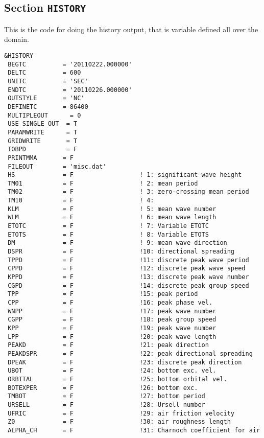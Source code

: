 \documentclass[12pt]{amsart}
\begin{document}
\subsection{Section {\tt HISTORY}}
This is the code for doing the history output, that is variable defined all over the domain.
\begin{verbatim}
&HISTORY
 BEGTC          = '20110222.000000'
 DELTC          = 600          
 UNITC          = 'SEC'        
 ENDTC          = '20110226.000000'
 OUTSTYLE       = 'NC'       
 DEFINETC       = 86400      
 MULTIPLEOUT      = 0        
 USE_SINGLE_OUT  = T         
 PARAMWRITE      = T       
 GRIDWRITE       = T       
 IOBPD           = F       
 PRINTMMA       = F        
 FILEOUT        = 'misc.dat'
 HS             = F                  ! 1: significant wave height
 TM01           = F                  ! 2: mean period
 TM02           = F                  ! 3: zero-crossing mean period
 TM10           = F                  ! 4: 
 KLM            = F                  ! 5: mean wave number
 WLM            = F                  ! 6: mean wave length
 ETOTC          = F                  ! 7: Variable ETOTC
 ETOTS          = F                  ! 8: Variable ETOTS
 DM             = F                  ! 9: mean wave direction
 DSPR           = F                  !10: directional spreading
 TPPD           = F                  !11: discrete peak wave period
 CPPD           = F                  !12: discrete peak wave speed
 KPPD           = F                  !13: discrete peak wave number
 CGPD           = F                  !14: discrete peak group speed
 TPP            = F                  !15: peak period  
 CPP            = F                  !16: peak phase vel. 
 WNPP           = F                  !17: peak wave number
 CGPP           = F                  !18: peak group speed
 KPP            = F                  !19: peak wave number
 LPP            = F                  !20: peak wave length 
 PEAKD          = F                  !21: peak direction
 PEAKDSPR       = F                  !22: peak directional spreading
 DPEAK          = F                  !23: discrete peak direction 
 UBOT           = F                  !24: bottom exc. vel. 
 ORBITAL        = F                  !25: bottom orbital vel. 
 BOTEXPER       = F                  !26: bottom exc.  
 TMBOT          = F                  !27: bottom period 
 URSELL         = F                  !28: Ursell number
 UFRIC          = F                  !29: air friction velocity
 Z0             = F                  !30: air roughness length
 ALPHA_CH       = F                  !31: Charnoch coefficient for air

\end{verbatim}
\end{document}
